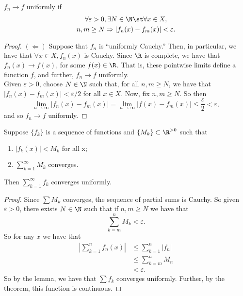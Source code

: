 \documentclass{notes}
\begin{document}
\begin{theorem}
  $f_n \to f$ uniformly if 
  \begin{gather*}
  \forall \varepsilon > 0, \exists N \in\N \st \forall x\in X, \\
  n,m \geq N \Rightarrow |f_n(x) - f_m(x)| < \varepsilon.
  \end{gather*}
\end{theorem}
\begin{proof}
  $(\Leftarrow)$ Suppose that $f_n$ is ``uniformly Cauchy.'' Then, in particular, we have that 
  $\forall x\in X, f_n(x)$ is Cauchy. Since $\R$ is complete, we have that $f_n(x) \to f(x)$, for
  some $f(x) \in \R$. That is, these pointwise limits define a function $f$, and further, $f_n\to f$
  uniformly. \\

  Given $\varepsilon > 0$, choose $N\in\N$ such that, for all $n,m \geq N$, we have that 
  $|f_n(x) - f_m(x)| < \varepsilon / 2$ for all $x\in X$. Now, fix $n,m \geq N$. So then
  $$\lim_{n\to\infty} |f_n(x) - f_m(x)| = \lim_{n\to\infty} |f(x) - f_m(x)| \leq
  \frac{\varepsilon}{2} < \varepsilon,$$
  and so $f_n \to f$ uniformly.
\end{proof}
\begin{corollary}
  Suppose $\{f_k\}$ is a sequence of functions and $\{M_k\}\subset\R^{>0}$ such that 
  \begin{enumerate}
    \item $|f_k(x)| < M_k$ for all x;
    \item  $\sum_{k=1}^\infty M_k $ converges.
  \end{enumerate}
  Then $\sum_{k=1}^\infty f_k$ converges uniformly.
\end{corollary}
\begin{proof}
  Since $\sum M_k$ converges, the sequence of partial sums is Cauchy. So given $\varepsilon > 0$, 
  there exists $N\in\N$ such that if $n,m \geq N$ we have that 
  $$\sum_{k=m}^n M_k < \varepsilon.$$
  So for any $x$ we have that 
  \begin{align*}
    \left| \sum_{k=1}^n f_n(x) \right| &\leq \sum_{k=1}^n |f_n| \\
                                       &\leq \sum_{k=m}^n M_n \\
                                       &< \varepsilon.
  \end{align*}
  So by the lemma, we have that $\sum f_k$ converges uniformly. Further, by the theorem, this function 
  is continuous.
\end{proof}
\end{document}
